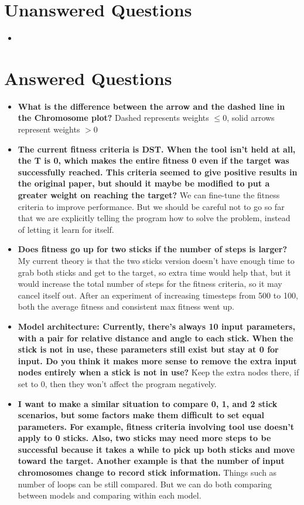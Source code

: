 \documentclass{article}
\begin{document}
\section{Unanswered Questions}
\begin{itemize}
    \item 
\end{itemize}

\section{Answered Questions}
\begin{itemize}
    \item \textbf{What is the difference between the arrow and the dashed line in the Chromosome plot?} Dashed represents weights $\leq 0$, solid arrows represent weights $> 0$
    
    \item \textbf{The current fitness criteria is DST. When the tool isn't held at all, the T is 0, which makes the entire fitness 0 even if the target was successfully reached. This criteria seemed to give positive results in the original paper, but should it maybe be modified to put a greater weight on reaching the target?} We can fine-tune the fitness criteria to improve performance. But we should be careful not to go so far that we are explicitly telling the program how to solve the problem, instead of letting it learn for itself.
    
    \item \textbf{Does fitness go up for two sticks if the number of steps is larger?} My current theory is that the two sticks version doesn't have enough time to grab both sticks and get to the target, so extra time would help that, but it would increase the total number of steps for the fitness criteria, so it may cancel itself out. After an experiment of increasing timesteps from 500 to 100, both the average fitness and consistent max fitness went up.
    
    \item \textbf{Model architecture: Currently, there's always 10 input parameters, with a pair for relative distance and angle to each stick. When the stick is not in use, these parameters still exist but stay at 0 for input. Do you think it makes more sense to remove the extra input nodes entirely when a stick is not in use?} Keep the extra nodes there, if set to 0, then they won't affect the program negatively. 
    
    \item \textbf{I want to make a similar situation to compare 0, 1, and 2 stick scenarios, but some factors make them difficult to set equal parameters. For example, fitness criteria involving tool use doesn't apply to 0 sticks. Also, two sticks may need more steps to be successful because it takes a while to pick up both sticks and move toward the target. Another example is that the number of input chromosomes change to record stick information.} Things such as number of loops can be still compared. But we can do both comparing between models and comparing within each model.
    

\end{itemize}
\end{document}
